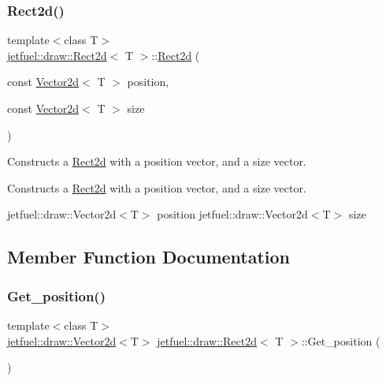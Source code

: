 \subsubsection{\texorpdfstring{Rect2d()}{Rect2d()}\hspace{0.1cm}{\footnotesize\ttfamily [3/3]}}
{\footnotesize\ttfamily template$<$class T$>$ \\
\hyperlink{classjetfuel_1_1draw_1_1Rect2d}{jetfuel\+::draw\+::\+Rect2d}$<$ T $>$\+::\hyperlink{classjetfuel_1_1draw_1_1Rect2d}{Rect2d} (\begin{DoxyParamCaption}\item[{const \hyperlink{classjetfuel_1_1draw_1_1Vector2d}{Vector2d}$<$ T $>$}]{position,  }\item[{const \hyperlink{classjetfuel_1_1draw_1_1Vector2d}{Vector2d}$<$ T $>$}]{size }\end{DoxyParamCaption})\hspace{0.3cm}{\ttfamily [inline]}}



Constructs a \hyperlink{classjetfuel_1_1draw_1_1Rect2d}{Rect2d} with a position vector, and a size vector. 

Constructs a \hyperlink{classjetfuel_1_1draw_1_1Rect2d}{Rect2d} with a position vector, and a size vector.

jetfuel\+::draw\+::\+Vector2d$<$\+T$>$ position jetfuel\+::draw\+::\+Vector2d$<$\+T$>$ size 

\subsection{Member Function Documentation}
\mbox{\label{classjetfuel_1_1draw_1_1Rect2d_abcc7abd189cc592850484d1314f6220b}} 
\subsubsection{\texorpdfstring{Get\+\_\+position()}{Get\_position()}}
{\footnotesize\ttfamily template$<$class T$>$ \\
\hyperlink{classjetfuel_1_1draw_1_1Vector2d}{jetfuel\+::draw\+::\+Vector2d}$<$T$>$ \hyperlink{classjetfuel_1_1draw_1_1Rect2d}{jetfuel\+::draw\+::\+Rect2d}$<$ T $>$\+::Get\+\_\+position (\begin{DoxyParamCaption}{ }\end{DoxyParamCaption})\hspace{0.3cm}{\ttfamily [inline]}}



